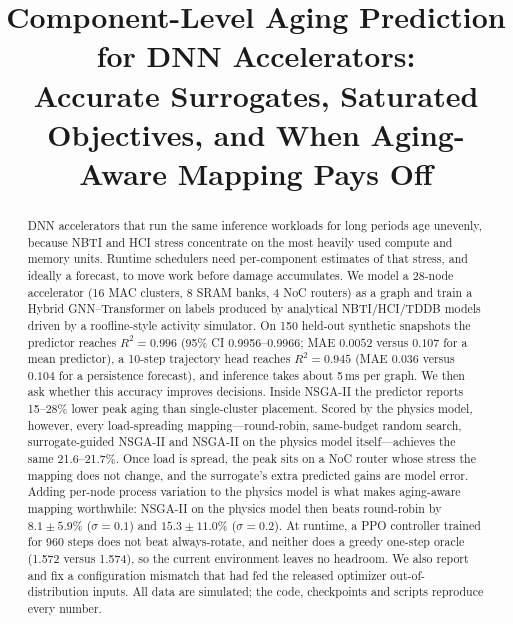 \documentclass[conference]{IEEEtran}
\begin{document}
\title{Component-Level Aging Prediction for DNN Accelerators: \\
Accurate Surrogates, Saturated Objectives, and When Aging-Aware Mapping Pays Off}

\author{
\and
{}
}

\maketitle

\begin{abstract}
DNN accelerators that run the same inference workloads for long periods age unevenly, because NBTI and HCI stress concentrate on the most heavily used compute and memory units. Runtime schedulers need per-component estimates of that stress, and ideally a forecast, to move work before damage accumulates. We model a 28-node accelerator (16 MAC clusters, 8 SRAM banks, 4 NoC routers) as a graph and train a Hybrid GNN--Transformer on labels produced by analytical NBTI/HCI/TDDB models driven by a roofline-style activity simulator. On 150 held-out synthetic snapshots the predictor reaches $R^2 = 0.996$ (95\% CI 0.9956--0.9966; MAE $0.0052$ versus $0.107$ for a mean predictor), a 10-step trajectory head reaches $R^2 = 0.945$ (MAE $0.036$ versus $0.104$ for a persistence forecast), and inference takes about 5\,ms per graph. We then ask whether this accuracy improves decisions. Inside NSGA-II the predictor reports 15--28\% lower peak aging than single-cluster placement. Scored by the physics model, however, every load-spreading mapping---round-robin, same-budget random search, surrogate-guided NSGA-II and NSGA-II on the physics model itself---achieves the same 21.6--21.7\%. Once load is spread, the peak sits on a NoC router whose stress the mapping does not change, and the surrogate's extra predicted gains are model error. Adding per-node process variation to the physics model is what makes aging-aware mapping worthwhile: NSGA-II on the physics model then beats round-robin by $8.1\pm5.9$\% ($\sigma = 0.1$) and $15.3\pm11.0$\% ($\sigma = 0.2$). At runtime, a PPO controller trained for 960 steps does not beat always-rotate, and neither does a greedy one-step oracle (1.572 versus 1.574), so the current environment leaves no headroom. We also report and fix a configuration mismatch that had fed the released optimizer out-of-distribution inputs. All data are simulated; the code, checkpoints and scripts reproduce every number.
\end{abstract}
\end{document}
